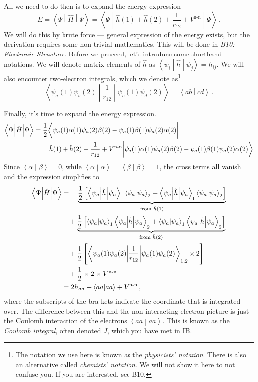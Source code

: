 \documentclass{article}
\theoremstyle{plain}\theoremheaderfont{\normalfont\itshape}\theorembodyfont{\rmfamily}\theoremseparator{.}\newtheorem*{rem}{Remark}\newtheorem*{ex}{Example}\newtheorem*{proof}{Proof}\newtheorem*{altp}{Alternative proof}
\theoremstyle{plain}\theoremheaderfont{\normalfont\bfseries}\theorembodyfont{\rmfamily}\theoremseparator{.}\newtheorem{thm}{Theorem}[section]\newtheorem{lem}[thm]{Lemma}\newtheorem{prop}[thm]{Proposition}\newtheorem*{cor}{Corollary}\newtheorem{defn}[thm]{Definition}\newtheorem{clm}[thm]{Claim}\newtheorem{clminproof}{Claim}\newtheorem{pos}{Postulate}[section]
\theoremstyle{break}\theoremheaderfont{\normalfont\itshape}\theorembodyfont{\rmfamily}\theoremseparator{.\medskip}\newtheorem*{proofskip}{Proof}\newtheorem*{exs}{Examples}\newtheorem*{rems}{Remarks}
\theoremstyle{break}\theoremheaderfont{\normalfont\bfseries}\theorembodyfont{\rmfamily}\theoremseparator{.\medskip}\newtheorem{lemskip}[thm]{Lemma}\newtheorem{defnskip}[thm]{Definition}\newtheorem{propskip}[thm]{Proposition}\newtheorem{thmskip}[thm]{Theorem}
\numberwithin{equation}{section}
\newcommand{\braket}[2]{\left\langle #1 \middle| #2 \right\rangle}
\newcommand{\expval}[2]{\left\langle #2 \middle| #1 \middle| #2 \right\rangle}
\newcommand{\mel}[3]{\left\langle #1 \middle| #2 \middle| #3 \right\rangle}
\begin{document}
    All we need to do then is to expand the energy expression
    \begin{equation}
        E=\expval{\hat{H}}{\Psi}=\expval{\hat{h}(1)+\hat{h}(2)+\frac{1}{r_{12}}+V^{\text{n-n}}}{\Psi}\,.
    \end{equation}
    We will do this by brute force --- general expression of the energy exists, but the derivation requires some non-trivial mathematics. This will be done in \textit{B10: Electronic Structure}. Before we proceed, let's introduce some shorthand notations. We will denote matrix elements of \(\hat{h}\) as \(\mel{\psi_i}{\hat{h}}{\psi_j}=h_{ij}\). We will also encounter two-electron integrals, which we denote as\footnote{The notation we use here is known as the \textit{physicists' notation}. There is also an alternative called \textit{chemists' notation}. We will not show it here to not confuse you. If you are interested, see B10.}
    \begin{equation}
        \mel{\psi_a(1)\psi_b(2)}{\frac{1}{r_{12}}}{\psi_c(1)\psi_d(2)}=\braket{ab}{cd}\,.
    \end{equation}
    
    Finally, it's time to expand the energy expression.
    \begin{align}
        \expval{\hat{H}}{\Psi}&=\frac{1}{2}\bigg\langle\psi_a(1)\alpha(1)\psi_a(2)\beta(2)-\psi_a(1)\beta(1)\psi_a(2)\alpha(2)\bigg| \notag \\
        &\left. \qquad\hat{h}(1)+\hat{h}(2)+\frac{1}{r_{12}}+V^{\text{n-n}}\middle|\psi_a(1)\alpha(1)\psi_a(2)\beta(2)-\psi_a(1)\beta(1)\psi_a(2)\alpha(2)\right\rangle
    \end{align}
    Since \(\braket{\alpha}{\beta}=0\), while \(\braket{\alpha}{\alpha}=\braket{\beta}{\beta}=1\), the cross terms all vanish and the expression simplifies to
    \begin{align}
        \expval{\hat{H}}{\Psi}&=\quad\underbrace{\frac{1}{2}\left[\mel{\psi_a}{\hat{h}}{\psi_a}_1\braket{\psi_a}{\psi_a}_2+\mel{\psi_a}{\hat{h}}{\psi_a}_1\braket{\psi_a}{\psi_a}_2\right]}_{\text{from }\hat{h}(1)}\notag\\
        &\quad+\underbrace{\frac{1}{2}\left[\braket{\psi_a}{\psi_a}_1\mel{\psi_a}{\hat{h}}{\psi_a}_2+\braket{\psi_a}{\psi_a}_1\mel{\psi_a}{\hat{h}}{\psi_a}_2\right]}_{\text{from }\hat{h}(2)}\notag\\
        &\quad+\frac{1}{2}\left[\mel{\psi_a(1)\psi_a(2)}{\frac{1}{r_{12}}}{\psi_a(1)\psi_a(2)}_{1,2}\times 2\right]\notag\\
        &\quad+\frac{1}{2}\times 2\times V^{\text{n-n}}\notag\\
        &=2h_{aa}+\braket{aa}{aa}+V^{\text{n-n}}\,,
    \end{align}
    where the subscripts of the bra-kets indicate the coordinate that is integrated over. The difference between this and the non-interacting electron picture is just the Coulomb interaction of the electrons \(\braket{aa}{aa}\). This is known as the \textit{Coulomb integral}, often denoted \(J\), which you have met in IB.
\end{document}
